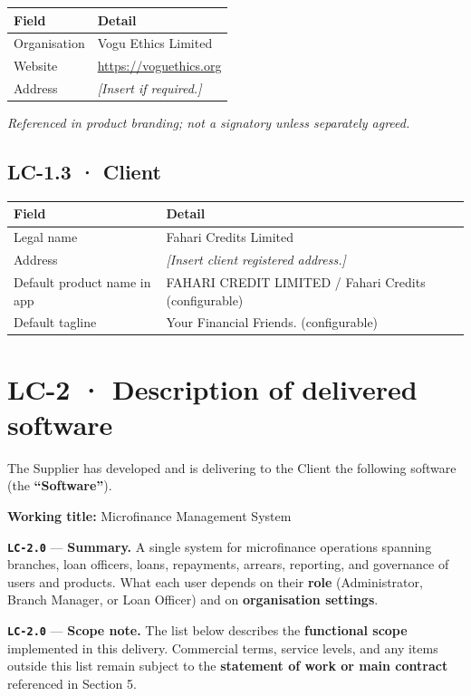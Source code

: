 \documentclass[11pt,a4paper]{article}
\newcommand{\LC}[1]{\textbf{\texttt{#1}}}
\begin{document}
\begin{tabular}{@{}ll@{}}
\toprule
\textbf{Field} & \textbf{Detail} \\
\midrule
Organisation & Vogu Ethics Limited \\
Website & \url{https://voguethics.org} \\
Address & \textit{[Insert if required.]} \\
\bottomrule
\end{tabular}

\vspace{0.3em}
\noindent\textit{Referenced in product branding; not a signatory unless separately agreed.}

\subsection*{LC-1.3 · Client}

\begin{tabular}{@{}>{\raggedright}p{4.2cm}p{9.5cm}@{}}
\toprule
\textbf{Field} & \textbf{Detail} \\
\midrule
Legal name & Fahari Credits Limited \\
Address & \textit{[Insert client registered address.]} \\
Default product name in app & FAHARI CREDIT LIMITED / Fahari Credits (configurable) \\
Default tagline & Your Financial Friends. (configurable) \\
\bottomrule
\end{tabular}

\section*{LC-2 · Description of delivered software}

The Supplier has developed and is delivering to the Client the following software (the \textbf{``Software''}).

\noindent\textbf{Working title:} Microfinance Management System

\LC{LC-2.0} --- \textbf{Summary.} A single system for microfinance operations spanning branches, loan officers, loans, repayments, arrears, reporting, and governance of users and products. What each user depends on their \textbf{role} (Administrator, Branch Manager, or Loan Officer) and on \textbf{organisation settings}.

\LC{LC-2.0} --- \textbf{Scope note.} The list below describes the \textbf{functional scope} implemented in this delivery. Commercial terms, service levels, and any items outside this list remain subject to the \textbf{statement of work or main contract} referenced in Section 5.
\end{document}
